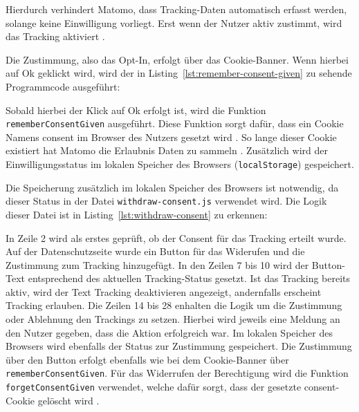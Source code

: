 Hierdurch verhindert Matomo, dass Tracking-Daten automatisch erfasst werden, solange keine Einwilligung vorliegt. Erst wenn der Nutzer aktiv zustimmt, wird das Tracking aktiviert \parencite{MatomoConsent}.

Die Zustimmung, also das Opt-In, erfolgt über das Cookie-Banner. Wenn hierbei auf \glqq Ok\grqq{} geklickt wird, wird der in Listing~\ref{lst:remember-consent-given} zu sehende Programmcode ausgeführt:

\begin{figure}[H]
    \centering
    \begin{minipage}{\textwidth}
        
    \end{minipage}
\end{figure}

Sobald hierbei der Klick auf \glqq Ok\grqq{} erfolgt ist, wird die Funktion \texttt{rememberConsentGiven} ausgeführt. Diese Funktion sorgt dafür, dass ein Cookie Namens \glqq consent\grqq{} im Browser des Nutzers gesetzt wird \parencite{MatomoConsent}. So lange dieser Cookie existiert hat Matomo die Erlaubnis Daten zu sammeln \parencite{MatomoConsent}. Zusätzlich wird der Einwilligungsstatus im lokalen Speicher des Browsers (\texttt{localStorage}) gespeichert.

Die Speicherung zusätzlich im lokalen Speicher des Browsers ist notwendig, da dieser Status in der Datei \texttt{withdraw-consent.js} verwendet wird. Die Logik dieser Datei ist in Listing~\ref{lst:withdraw-consent} zu erkennen: 

\begin{figure}[H]
    \centering
    \begin{minipage}{\textwidth}
        
    \end{minipage}
\end{figure}

In Zeile 2 wird als erstes geprüft, ob der Consent für das Tracking erteilt wurde. Auf der Datenschutzseite wurde ein Button für das Widerufen und die Zustimmung zum Tracking hinzugefügt. In den Zeilen 7 bis 10 wird der Button-Text entsprechend des aktuellen Tracking-Status gesetzt. Ist das Tracking bereits aktiv, wird der Text \glqq Tracking deaktivieren\grqq{} angezeigt, andernfalls erscheint \glqq Tracking erlauben\grqq{}. Die Zeilen 14 bis 28 enhalten die Logik um die Zustimmung oder Ablehnung den Trackings zu setzen. Hierbei wird jeweils eine Meldung an den Nutzer gegeben, dass die Aktion erfolgreich war. Im lokalen Speicher des Browsers wird ebenfalls der Status zur Zustimmung gespeichert. Die Zustimmung über den Button erfolgt ebenfalls wie bei dem Cookie-Banner über \texttt{rememberConsentGiven}. Für das Widerrufen der Berechtigung wird die Funktion \texttt{forgetConsentGiven} verwendet, welche dafür sorgt, dass der gesetzte \glqq consent\grqq{}-Cookie gelöscht wird \parencite{MatomoConsent}.

